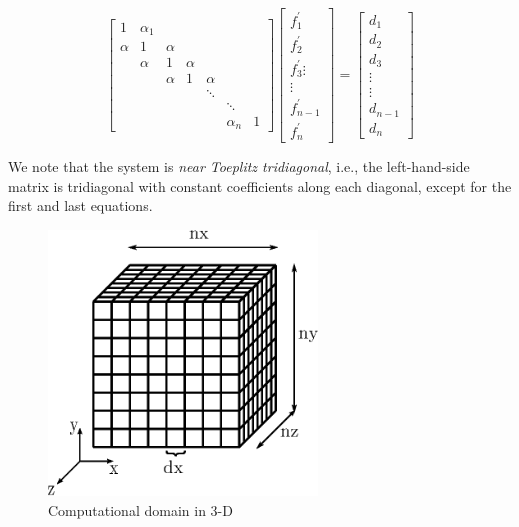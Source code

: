 \documentclass{elsarticle}
\begin{document}
\begin{equation} \label{eqn:compact-tridiagonal-system}
\begin{bmatrix}
     1 &  \alpha_1  \\
     \alpha   &  1   &  \alpha \\
         &  \alpha   &  1  &  \alpha  \\
         &      &  \alpha  &  1  &  \alpha  \\
         &      &     &     &  \ddots \\
         &      &     &     &     &  \ddots  \\
         &      &     &     &     &  \alpha_n &  1
\end{bmatrix}
\begin{bmatrix}
    f^{\prime}_1 \\
    f^{\prime}_2 \\
    f^{\prime}_3 
    \vdots \\
    \vdots \\
    f^{\prime}_{n-1} \\
    f^{\prime}_n
 \end{bmatrix}
=
\begin{bmatrix}
   d_1 \\
   d_2 \\
   d_3 \\
   \vdots \\
   \vdots \\
   d_{n-1} \\
   d_{n}
\end{bmatrix}
\end{equation}

We note that the system is \emph{near Toeplitz tridiagonal},
i.e., the left-hand-side matrix is tridiagonal with
constant coefficients along each diagonal,
except for the first and last equations.


\begin{figure}[h!]
\begin{center}
\includegraphics[height=200pt]{img/computational-domain.eps}
\end{center}
\caption{Computational domain in 3-D}
\label{fig:computational-domain}
\end{figure}
\end{document}
